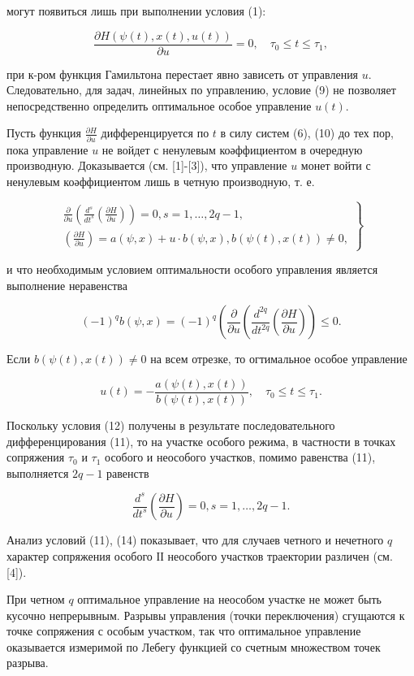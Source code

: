 \documentclass[10pt]{article}
\begin{document}
могут появиться лишь при выполнении условия (1):

\[
\frac{\partial H(\psi(t), x(t), u(t))}{\partial u}=0, \quad \tau_{0} \leqslant t \leqslant \tau_{1},
\]

при к-ром функция Гамильтона перестает явно зависеть от управления $u$. Следовательно, для задач, линейных по управлению, условие (9) не позволяет непосредственно определить оптимальное особое управление $u(t)$.

Пусть функция $\frac{\partial H}{\partial u}$ дифференцируется по $t$ в силу систем (6), (10) до тех пор, пока управление $u$ не войдет с ненулевым коәффициентом в очередную производную. Доказывается (см. [1]-[3]), что управление $u$ монет войти с ненулевым коәффициентом лишь в четную производную, т. е.

\[
\left.\begin{array}{c}
\frac{\partial}{\partial u}\left(\frac{d^{s}}{d t^{s}}\left(\frac{\partial H}{\partial u}\right)\right)=0, s=1, \ldots, 2 q-1, \\
\left(\frac{\partial H}{\partial u}\right)=a(\psi, x)+u \cdot b(\psi, x), b(\psi(t), x(t)) \neq 0,
\end{array}\right\}
\]

и что необходимым условием оптимальности особого управления является выполнение неравенства

\[
(-1)^{q} b(\psi, x)=(-1)^{q}\left(\frac{\partial}{\partial u}\left(\frac{d^{2 q}}{d t^{2 q}}\left(\frac{\partial H}{\partial u}\right)\right) \leqslant 0 .\right.
\]

Если $b(\psi(t), x(t)) \neq 0$ на всем отрезке, то огтимальное особое управление

\[
u(t)=-\frac{a(\psi(t), x(t))}{b(\psi(t), x(t))}, \quad \tau_{0} \leqslant t \leqslant \tau_{1} .
\]

Поскольку условия (12) получены в результате последовательного дифференцирования (11), то на участке особого режима, в частности в точках сопряжения $\tau_{0}$ и $\tau_{1}$ особого и неособого участков, помимо равенства (11), выполняется $2 q-1$ равенств

\[
\frac{d^{s}}{d t^{s}}\left(\frac{\partial H}{\partial u}\right)=0, s=1, \ldots, 2 q-1 .
\]

Анализ условий (11), (14) показывает, что для случаев четного и нечетного $q$ характер сопряжения особого ІІ неособого участков траектории различен (см. [4]).

При четном $q$ оптимальное управление на неособом участке не может быть кусочно непрерывным. Разрывы управления (точки переключения) сгущаются к точке сопряжения с особым участком, так что оптимальное управление оказывается измеримой по Лебегу функцией со счетным множеством точек разрыва.
\end{document}
